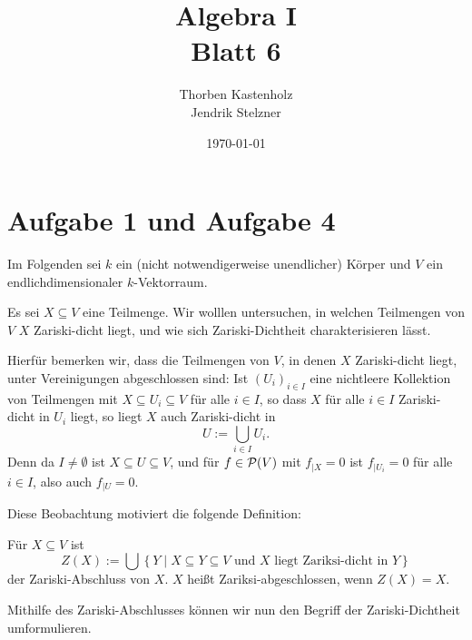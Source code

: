 \documentclass[a4paper,10pt]{article}
\title{\sc Algebra I \\ \Large Blatt 6}
\author{Thorben Kastenholz \\ Jendrik Stelzner}
\date{\today}
\begin{document}
\maketitle





\addtocounter{section}{1}
\section*{Aufgabe 1 und Aufgabe 4}
Im Folgenden sei $k$ ein (nicht notwendigerweise unendlicher) Körper und $V$ ein endlichdimensionaler $k$-Vektorraum.

Es sei $X \subseteq V$ eine Teilmenge. Wir wolllen untersuchen, in welchen Teilmengen von $V$ $X$ Zariski-dicht liegt, und wie sich Zariski-Dichtheit charakterisieren lässt.

Hierfür bemerken wir, dass die Teilmengen von $V$, in denen $X$ Zariski-dicht liegt, unter Vereinigungen abgeschlossen sind: Ist $(U_i)_{i \in I}$ eine nichtleere Kollektion von Teilmengen mit $X \subseteq U_i \subseteq V$ für alle $i \in I$, so dass $X$ für alle $i \in I$ Zariski-dicht in $U_i$ liegt, so liegt $X$ auch Zariski-dicht in
\[
 U := \bigcup_{i \in I} U_i.
\]
Denn da $I \neq \emptyset$ ist $X \subseteq U \subseteq V$, und für $f \in \mathcal{P}(V)$ mit $f_{|X} = 0$ ist $f_{|U_i} = 0$ für alle $i \in I$, also auch $f_{|U} = 0$.

Diese Beobachtung motiviert die folgende Definition:

\begin{defi}
 Für $X \subseteq V$ ist
 \[
  Z(X) := \bigcup \left\{ Y \mid X \subseteq Y \subseteq V \text{ und $X$ liegt Zariksi-dicht in $Y$} \right\}
 \]
 der Zariski-Abschluss von $X$. $X$ heißt Zariksi-abgeschlossen, wenn $Z(X) = X$.
\end{defi}


Mithilfe des Zariski-Abschlusses können wir nun den Begriff der Zariski-Dichtheit umformulieren.
\end{document}
